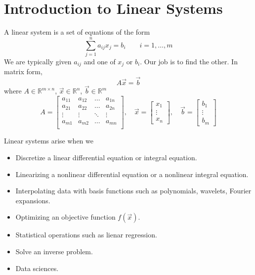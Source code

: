 \section{Introduction to Linear Systems}

A linear system is a set of equations of the form 
%
\begin{equation*}
    \sum_{j=1}^n a_{ij} x_j  = b_i \qquad i=1, \ldots, m
\end{equation*}
%
We are typically given $a_{ij}$ and one of $x_j$ or $b_i$. 
Our job is to find the other. In matrix form, 
\begin{equation*}
    A \Vec{x} = \Vec{b}
\end{equation*}
where 
$A \in \mathbb{R}^{m \times n}$, 
$\Vec{x}\in \mathbb{R}^{n}$, 
$\Vec{b}\in \mathbb{R}^{m}$
%
\begin{equation*}
    A = 
    \begin{bmatrix}
    a_{11} & a_{12} & \ldots & a_{1n}\\
    a_{21} & a_{22} & \ldots & a_{2n}\\
    \vdots & \vdots  & \ddots & \vdots\\
    a_{m1} & a_{m2} & \ldots & a_{mn}\\
    \end{bmatrix}
    ,\quad
    \Vec{x}  = \begin{bmatrix}x_1\\\vdots\\x_n\end{bmatrix}
    ,\quad
    \Vec{b}  = \begin{bmatrix}b_1\\\vdots\\b_m\end{bmatrix}
\end{equation*}

Linear systems arise when we 
\begin{itemize}[label={--}]
    \item Discretize a linear differential equation or integral equation.
    \item Linearizing a nonlinear differential equation 
	    or a nonlinear integral equation.
    \item Interpolating data with basis functions 
	    such as polynomials, wavelets, Fourier expansions.
    \item Optimizing an objective function $f\left(\Vec{x}\right)$. 
    \item Statistical operations such as lienar regression. 
    \item Solve an inverse problem. 
    \item Data sciences.
\end{itemize}

